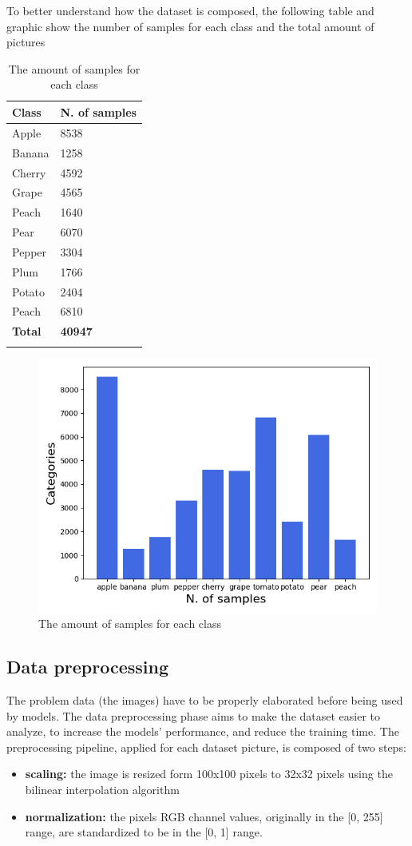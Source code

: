 To better understand how the dataset is composed, the following table
and graphic show the number of samples for each class and the total
amount of pictures

\begin{longtable}[]{@{}ll@{}}
\toprule
\textbf{Class} & \textbf{N. of samples}\tabularnewline
\midrule
\endhead
Apple & 8538\tabularnewline
Banana & 1258\tabularnewline
Cherry & 4592\tabularnewline
Grape & 4565\tabularnewline
Peach & 1640\tabularnewline
Pear & 6070\tabularnewline
Pepper & 3304\tabularnewline
Plum & 1766\tabularnewline
Potato & 2404\tabularnewline
Peach & 6810\tabularnewline
\textbf{Total} & \textbf{40947}\tabularnewline
\bottomrule
\caption{The amount of samples for each class}
\end{longtable}

\begin{figure}[h!]
\centering
\includegraphics[width=0.9\linewidth]{../images/n_samples.png}
\caption{The amount of samples for each class}
\end{figure}

\subsection{Data preprocessing}\label{header-n75}

The problem data (the images) have to be properly elaborated before
being used by models. The data preprocessing phase aims to make the
dataset easier to analyze, to increase the models' performance, and
reduce the training time. The preprocessing pipeline, applied for each
dataset picture, is composed of two steps:

\begin{itemize}
\item
  \textbf{scaling:} the image is resized form 100x100 pixels to 32x32
  pixels using the bilinear interpolation algorithm
\item
  \textbf{normalization:} the pixels RGB channel values, originally in
  the {[}0, 255{]} range, are standardized to be in the {[}0, 1{]}
  range.
\end{itemize}


